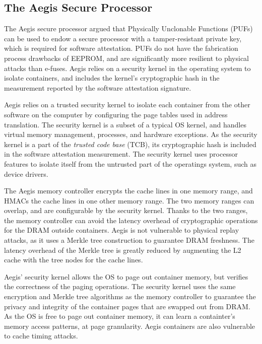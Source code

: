 \subsection{The Aegis Secure Processor}

The Aegis secure processor \cite{suh2003aegis} \cite{aegis_impl} argued that Physically
Unclonable Functions (PUFs) \cite{gassend2002puf} can be used to endow a
secure processor with a tamper-resistant private key, which is required for
software attestation. PUFs do not have the fabrication process drawbacks of
EEPROM, and are significantly more resilient to physical attacks than e-fuses.
Aegis relies on a security kernel in the operating system to isolate
containers, and includes the kernel's cryptographic hash in the measurement
reported by the software attestation signature.

Aegis relies on a trusted security kernel to isolate each container from the
other software on the computer by configuring the page tables used in address
translation. The security kernel is a subset of a typical OS kernel, and
handles virtual memory management, processes, and hardware exceptions. As the
security kernel is a part of the \textit{trusted code base} (TCB), its
cryptographic hash is included in the software attestation measurement. The
security kernel uses processor features to isolate itself from the untrusted
part of the operatings system, such as device drivers.

The Aegis memory controller encrypts the cache lines in one memory range, and
HMACs the cache lines in one other memory range. The two memory ranges can
overlap, and are configurable by the security kernel. Thanks to the two ranges,
the memory controller can avoid the latency overhead of cryptographic
operations for the DRAM outside containers. Aegis is not vulnerable to physical
replay attacks, as it uses a Merkle tree construction \cite{gassend2003merkle}
to guarantee DRAM freshness. The latency overhead of the Merkle tree is greatly
reduced by augmenting the L2 cache with the tree nodes for the cache lines.

Aegis' security kernel allows the OS to page out container memory, but verifies
the correctness of the paging operations. The security kernel uses the same
encryption and Merkle tree algorithms as the memory controller to guarantee the
privacy and integrity of the container pages that are swapped out from DRAM.
As the OS is free to page out container memory, it can learn a containter's
memory access patterns, at page granularity. Aegis containers are also
vulnerable to cache timing attacks.
